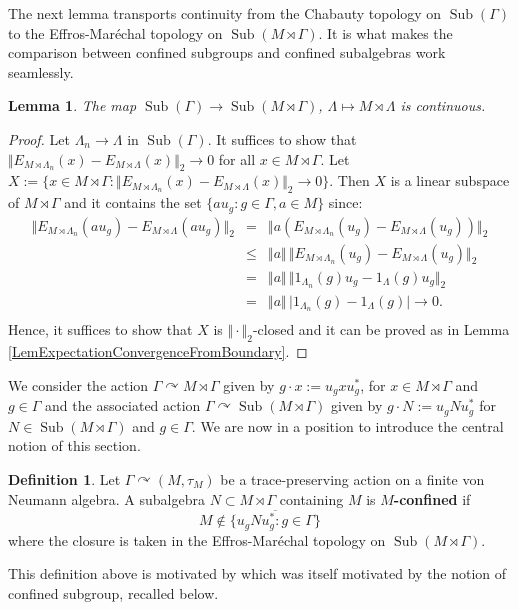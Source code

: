 \documentclass[12pt]{amsart} %
\theoremstyle{plain}
\newtheorem{lemma}[theorem]{Lemma}
\theoremstyle{definition}
\newtheorem{definition}[theorem]{Definition}
\DeclareMathOperator{\Sub}{Sub}
\begin{document}
The next lemma transports continuity from the Chabauty topology on $\Sub(\Gamma)$ to the Effros-Mar\'echal topology on $\Sub(M\rtimes\Gamma)$. It is what makes the comparison between confined subgroups and confined subalgebras work seamlessly.
\begin{lemma}\label{LemmaChabauty} The map $\Sub(\Gamma)\to\Sub(M\rtimes\Gamma)$, $\Lambda\mapsto M\rtimes\Lambda$ is continuous.\end{lemma}
\begin{proof} Let $\Lambda_n\rightarrow\Lambda$ in $\Sub(\Gamma)$.  It suffices to show that $\Vert E_{M\rtimes\Lambda_n}(x)-E_{M\rtimes\Lambda}(x)\Vert_2\rightarrow 0$ for all $x\in M\rtimes\Gamma$. Let $X:=\{x\in M\rtimes\Gamma:\Vert E_{M\rtimes\Lambda_n}(x)-E_{M\rtimes\Lambda}(x)\Vert_2\rightarrow 0\}$. Then $X$ is a linear subspace of $M\rtimes\Gamma$ and it contains the set $\{au_g:g\in\Gamma,a\in M\}$ since:
\begin{eqnarray*}
\Vert E_{M\rtimes\Lambda_n}(au_g)-E_{M\rtimes\Lambda}(au_g)\Vert_2&=&\Vert a(E_{M\rtimes\Lambda_n}(u_g)-E_{M\rtimes\Lambda}(u_g))\Vert_2\\
&\leq&\Vert a\Vert\,\Vert E_{M\rtimes\Lambda_n}(u_g)- E_{M\rtimes\Lambda}(u_g)\Vert_2\\
&=&\Vert a\Vert\,\Vert 1_{\Lambda_n}(g)u_g- 1_\Lambda(g)u_g\Vert_2\\
&=&\Vert a\Vert\,\vert 1_{\Lambda_n}(g)- 1_\Lambda(g)\vert\to 0.\\
\end{eqnarray*}
Hence, it suffices to show that $X$ is $\Vert\cdot\Vert_2$-closed and it can be proved as in Lemma \ref{LemExpectationConvergenceFromBoundary}.\end{proof}
We consider the action $\Gamma\curvearrowright M\rtimes\Gamma$ given by $g\cdot x:=u_gxu_g^*$, for $x\in M\rtimes\Gamma$ and $g\in\Gamma$ and the associated action $\Gamma\curvearrowright\Sub(M\rtimes\Gamma)$ given by $g\cdot N:=u_gNu_g^*$ for $N\in\Sub(M\rtimes\Gamma)$ and $g\in\Gamma$. We are now in a position to introduce the central notion of this section.
\begin{definition}\label{DefRelativeConfinedSubalg}
Let $\Gamma \curvearrowright (M,\tau_M)$ be a trace-preserving action on a finite
von Neumann algebra. A subalgebra $N\subset M\rtimes\Gamma$ containing $M$ is \textbf{$M$-confined} if
\[
M\notin \overline{\{u_gNu_g^*:g\in \Gamma\}}
\]
where the closure is taken in the Effros-Mar\'echal topology on $\Sub(M\rtimes\Gamma)$.
\end{definition}
\noindent This definition above is motivated by \cite[Definition 1.1]{AJ} which was itself motivated by the notion of confined subgroup, recalled below.
\end{document}
